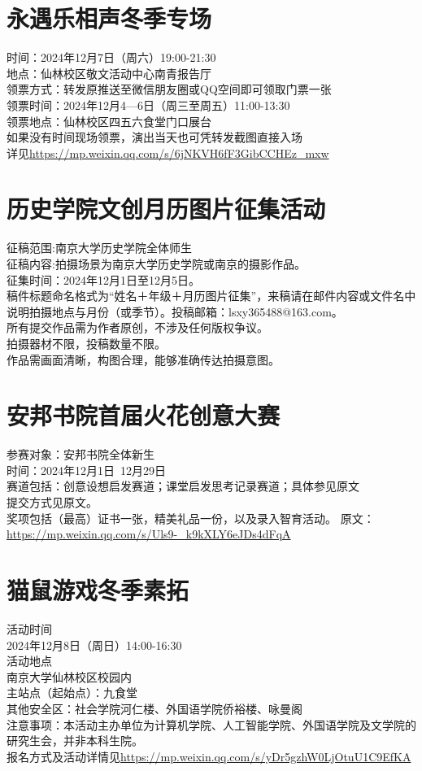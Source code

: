 \documentclass[letterpaper, 12pt]{article}
\begin{document}
\begin{multicols}{2}
\section{永遇乐相声冬季专场}
时间：2024年12月7日（周六）19:00-21:30\\
地点：仙林校区敬文活动中心南青报告厅\\
领票方式：转发原推送至微信朋友圈或QQ空间即可领取门票一张\\
领票时间：2024年12月4—6日（周三至周五）11:00-13:30\\
领票地点：仙林校区四五六食堂门口展台\\
如果没有时间现场领票，演出当天也可凭转发截图直接入场\\
详见\url{https://mp.weixin.qq.com/s/6jNKVH6fF3GibCCHEz_mxw}

\section{历史学院文创月历图片征集活动}
征稿范围:南京大学历史学院全体师生\\
征稿内容:拍摄场景为南京大学历史学院或南京的摄影作品。\\
征集时间：2024年12月1日至12月5日。\\
稿件标题命名格式为“姓名＋年级＋月历图片征集”，来稿请在邮件内容或文件名中说明拍摄地点与月份（或季节）。投稿邮箱：lsxy365488@163.com。\\
所有提交作品需为作者原创，不涉及任何版权争议。\\
拍摄器材不限，投稿数量不限。\\
作品需画面清晰，构图合理，能够准确传达拍摄意图。\\

\section{安邦书院首届火花创意大赛}
参赛对象：安邦书院全体新生\\
时间：2024年12月1日~12月29日\\
赛道包括：创意设想启发赛道；课堂启发思考记录赛道；具体参见原文\\
提交方式见原文。\\
奖项包括（最高）证书一张，精美礼品一份，以及录入智育活动。
原文：\url{https://mp.weixin.qq.com/s/Uls9-_k9kXLY6eJDs4dFqA}

\section{猫鼠游戏冬季素拓}
活动时间\\
2024年12月8日（周日）14:00-16:30\\
活动地点\\
南京大学仙林校区校园内\\
主站点（起始点）：九食堂\\
其他安全区：社会学院河仁楼、外国语学院侨裕楼、咏曼阁\\
注意事项：本活动主办单位为计算机学院、人工智能学院、外国语学院及文学院的研究生会，并非本科生院。\\
报名方式及活动详情见\url{https://mp.weixin.qq.com/s/yDr5gzhW0LjOtuU1C9EfKA}

\end{multicols}
\end{document}
